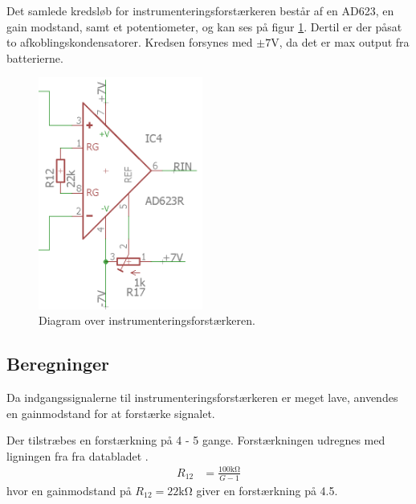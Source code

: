 Det samlede kredsløb for instrumenteringsforstærkeren består af en AD623, en gain modstand, samt et potentiometer, og kan ses på figur \ref{fig:instrumentation_amplifier}. Dertil er der påsat to afkoblingskondensatorer. Kredsen forsynes med $\pm 7 \si{\volt}$, da det er max output fra batterierne. 
\begin{figure}
	\centering
	\includegraphics[width=0.48\textwidth]{billeder/instrumentation_amplifier.png}
	\caption{Diagram over instrumenteringsforstærkeren.}
	\label{fig:instrumentation_amplifier}
\end{figure}
\subsection{Beregninger}
Da indgangssignalerne til instrumenteringsforstærkeren er meget lave, anvendes en gainmodstand for at forstærke signalet.

Der tilstræbes en forstærkning på 4 - 5 gange. Forstærkningen udregnes med ligningen fra fra databladet \cite[side 11]{AD623}.
\begin{align}
	R_{12} & = \frac{100 \si{\kilo\ohm}}{G-1}
\end{align}
hvor en gainmodstand på $R_{12} = 22 \si{\kilo\ohm}$ giver en forstærkning på \num{4.5}.